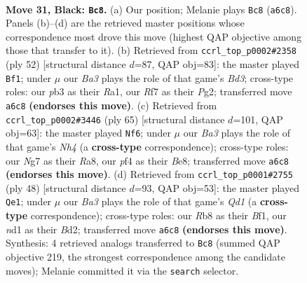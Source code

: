 \documentclass[11pt]{article}
\begin{document}
\clearpage

\begin{figure}[p]\centering
\begin{subfigure}{0.46\textwidth}\centering
\resizebox{\linewidth}{!}{%
\newchessgame
\chessboard[
  setfen={1r1q2k1/p1n1brn1/b6p/P1p2p2/3p1Pp1/1P4P1/QR1RP1BP/2BNN1K1 b - - 1 31},
  showmover=false,
  pgfstyle=straightmove, color=movearrow, markmove={a6-c8}
]}
\caption{}
\end{subfigure}\hfill
\begin{subfigure}{0.46\textwidth}\centering
\resizebox{\linewidth}{!}{%
\newchessgame
\chessboard[
  setfen={r1r4k/1b1nb1pp/1q2p3/p2pPp2/3P1P2/3BB3/RP3NPP/R2Q2K1 w - - 1 27},
  showmover=false,
  pgfstyle=straightmove, color=movearrow, markmove={d3-f1}
]}
\caption{}
\end{subfigure}
\\[4pt]
\begin{subfigure}{0.46\textwidth}\centering
\resizebox{\linewidth}{!}{%
\newchessgame
\chessboard[
  setfen={r3b1k1/r1q1bpp1/1p2p2p/4p2n/1PP1P3/2N2PPP/2Q2B1K/1R1R1B2 b - - 0 33},
  showmover=false,
  pgfstyle=straightmove, color=movearrow, markmove={h5-f6}
]}
\caption{}
\end{subfigure}\hfill
\begin{subfigure}{0.46\textwidth}\centering
\resizebox{\linewidth}{!}{%
\newchessgame
\chessboard[
  setfen={1r1qr1k1/3b1npp/n2p1p2/1ppP4/p3P3/P3RNPP/1P1B1P2/2RQ1BK1 w - - 5 25},
  showmover=false,
  pgfstyle=straightmove, color=movearrow, markmove={d1-e1}
]}
\caption{}
\end{subfigure}
\caption{\textbf{Move 31, Black: \texttt{Bc8}.} (a) Our position; Melanie plays \texttt{Bc8} (\texttt{a6c8}). Panels (b)--(d) are the retrieved master positions whose correspondence most drove this move (highest QAP objective among those that transfer to it). (b) Retrieved from \texttt{ccrl\_top\_p0002\#2358} (ply 52) [structural distance $d$=87, QAP obj=83]: the master played \texttt{Bf1}; under $\mu$ our \emph{Ba3} plays the role of that game's \emph{Bd3}; cross-type roles: our \emph{p}b3 as their \emph{R}a1, our \emph{R}f7 as their \emph{P}g2; transferred move \texttt{a6c8} \textbf{(endorses this move)}. (c) Retrieved from \texttt{ccrl\_top\_p0002\#3446} (ply 65) [structural distance $d$=101, QAP obj=63]: the master played \texttt{Nf6}; under $\mu$ our \emph{Ba3} plays the role of that game's \emph{Nh4} (a \textbf{cross-type} correspondence); cross-type roles: our \emph{N}g7 as their \emph{R}a8, our \emph{p}f4 as their \emph{B}e8; transferred move \texttt{a6c8} \textbf{(endorses this move)}. (d) Retrieved from \texttt{ccrl\_top\_p0001\#2755} (ply 48) [structural distance $d$=93, QAP obj=53]: the master played \texttt{Qe1}; under $\mu$ our \emph{Ba3} plays the role of that game's \emph{Qd1} (a \textbf{cross-type} correspondence); cross-type roles: our \emph{R}b8 as their \emph{B}f1, our \emph{n}d1 as their \emph{B}d2; transferred move \texttt{a6c8} \textbf{(endorses this move)}. Synthesis: 4 retrieved analogs transferred to \texttt{Bc8} (summed QAP objective 219, the strongest correspondence among the candidate moves); Melanie committed it via the \texttt{search} selector.}
\label{fig:thought-m61}
\end{figure}
\end{document}

